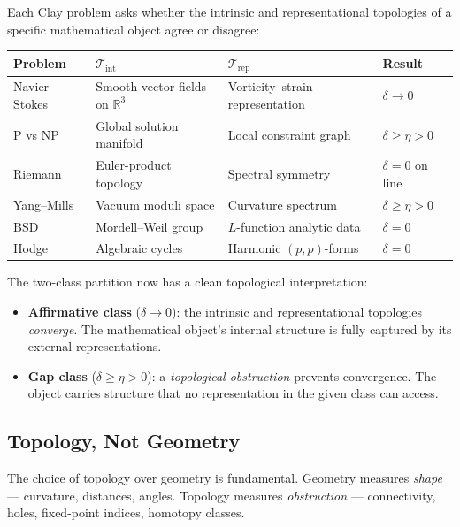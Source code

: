 \documentclass[11pt]{article}
\begin{document}
Each Clay problem asks whether the intrinsic and representational topologies
of a specific mathematical object agree or disagree:

\begin{center}
\renewcommand{\arraystretch}{1.3}
\begin{tabular}{@{}lp{3.2cm}p{3.5cm}p{2.2cm}@{}}
\toprule
\textbf{Problem} & $\mathcal{T}_{\mathrm{int}}$ & $\mathcal{T}_{\mathrm{rep}}$ & \textbf{Result} \\
\midrule
Navier--Stokes & Smooth vector fields on $\mathbb{R}^3$ & Vorticity--strain representation & $\delta \to 0$ \\
P vs NP & Global solution manifold & Local constraint graph & $\delta \geq \eta > 0$ \\
Riemann & Euler-product topology & Spectral symmetry & $\delta = 0$ on line \\
Yang--Mills & Vacuum moduli space & Curvature spectrum & $\delta \geq \eta > 0$ \\
BSD & Mordell--Weil group & $L$-function analytic data & $\delta = 0$ \\
Hodge & Algebraic cycles & Harmonic $(p,p)$-forms & $\delta = 0$ \\
\bottomrule
\end{tabular}
\end{center}

\noindent
The two-class partition now has a clean topological interpretation:

\begin{itemize}
\item \textbf{Affirmative class} ($\delta \to 0$): the intrinsic and
representational topologies \emph{converge}.  The mathematical object's
internal structure is fully captured by its external representations.
\item \textbf{Gap class} ($\delta \geq \eta > 0$): a \emph{topological
obstruction} prevents convergence.  The object carries structure that no
representation in the given class can access.
\end{itemize}

\subsection{Topology, Not Geometry}
\label{subsec:why-topology}

The choice of topology over geometry is fundamental.  Geometry measures
\emph{shape} --- curvature, distances, angles.  Topology measures
\emph{obstruction} --- connectivity, holes, fixed-point indices, homotopy
classes.
\end{document}

